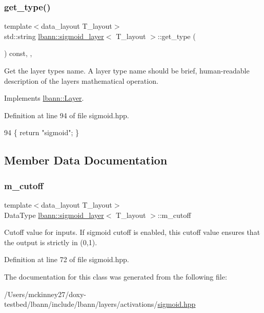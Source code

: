 \subsubsection{\texorpdfstring{get\+\_\+type()}{get\_type()}}
{\footnotesize\ttfamily template$<$data\+\_\+layout T\+\_\+layout$>$ \\
std\+::string \hyperlink{classlbann_1_1sigmoid__layer}{lbann\+::sigmoid\+\_\+layer}$<$ T\+\_\+layout $>$\+::get\+\_\+type (\begin{DoxyParamCaption}{ }\end{DoxyParamCaption}) const\hspace{0.3cm}{\ttfamily [inline]}, {\ttfamily [override]}, {\ttfamily [virtual]}}

Get the layer type\textquotesingle{}s name. A layer type name should be brief, human-\/readable description of the layer\textquotesingle{}s mathematical operation. 

Implements \hyperlink{classlbann_1_1Layer_a0fa0ea9160b490c151c0a17fde4f7239}{lbann\+::\+Layer}.



Definition at line 94 of file sigmoid.\+hpp.


\begin{DoxyCode}
94 \{ \textcolor{keywordflow}{return} \textcolor{stringliteral}{"sigmoid"}; \}
\end{DoxyCode}


\subsection{Member Data Documentation}
\mbox{\label{classlbann_1_1sigmoid__layer_ab4a50a9ae123aef61ff3f0c9c066bdff}} 
\subsubsection{\texorpdfstring{m\+\_\+cutoff}{m\_cutoff}}
{\footnotesize\ttfamily template$<$data\+\_\+layout T\+\_\+layout$>$ \\
Data\+Type \hyperlink{classlbann_1_1sigmoid__layer}{lbann\+::sigmoid\+\_\+layer}$<$ T\+\_\+layout $>$\+::m\+\_\+cutoff\hspace{0.3cm}{\ttfamily [private]}}

Cutoff value for inputs. If sigmoid cutoff is enabled, this cutoff value ensures that the output is strictly in (0,1). 

Definition at line 72 of file sigmoid.\+hpp.



The documentation for this class was generated from the following file\+:\begin{DoxyCompactItemize}
\item 
/\+Users/mckinney27/doxy-\/testbed/lbann/include/lbann/layers/activations/\hyperlink{sigmoid_8hpp}{sigmoid.\+hpp}\end{DoxyCompactItemize}
